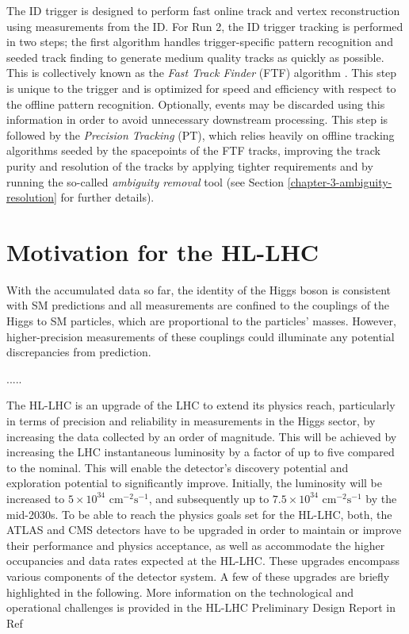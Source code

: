 The ID trigger is designed to perform fast online track and vertex reconstruction using measurements from the ID. For Run 2, the ID trigger tracking is performed in two steps; the first algorithm handles trigger-specific pattern recognition and seeded track finding to generate medium quality tracks as quickly as possible. This is collectively known as the \textit{Fast Track Finder} (FTF) algorithm \cite{Penc:2104217, Grandi:2624768}. This step is unique to the trigger and is optimized for speed and efficiency with respect to the offline pattern recognition. Optionally, events may be discarded using this information in order to avoid unnecessary downstream processing. This step is followed by the \textit{Precision Tracking} (PT), which relies heavily on offline tracking algorithms \cite{T_Cornelissen_2008} seeded by the spacepoints of the FTF tracks, improving the track purity and resolution of the tracks by applying tighter requirements and by running the so-called \textit{ambiguity removal} tool (see Section \ref{chapter-3-ambiguity-resolution} for further details). 



\section{Motivation for the HL-LHC}
\label{hi-lumi}


With the accumulated data so far, the identity of the Higgs boson is consistent with SM predictions and all measurements are confined to the couplings of the Higgs to SM particles, which are proportional to the particles’ masses. However, higher-precision measurements of these couplings could illuminate any potential discrepancies from prediction.

.....

The HL-LHC is an upgrade of the \ac{LHC} to extend its physics reach, particularly in terms of precision and reliability in measurements in the Higgs sector, by increasing the data collected by an order of magnitude. This will be achieved by increasing the LHC instantaneous luminosity by a factor of up to five compared to the nominal. This will enable the detector's discovery potential and exploration potential to significantly improve. Initially, the luminosity will be increased to $5 \times 10^{34}  \text{ cm}^{−2}\text{s}^{−1}$, and subsequently up to $7.5 \times 10^{34}  \text{ cm}^{−2}\text{s}^{−1}$ by the mid-2030s. To be able to reach the physics goals set for the HL-LHC, both, the ATLAS and CMS detectors have to be upgraded in order to maintain or improve their performance and physics acceptance, as well as accommodate the higher occupancies and data rates expected at the HL-LHC. These upgrades encompass various components of the detector system. A few of these upgrades are briefly highlighted in the following. More information on the technological and operational challenges is provided in the HL-LHC Preliminary Design Report in Ref \cite{Apollinari:2116337}


